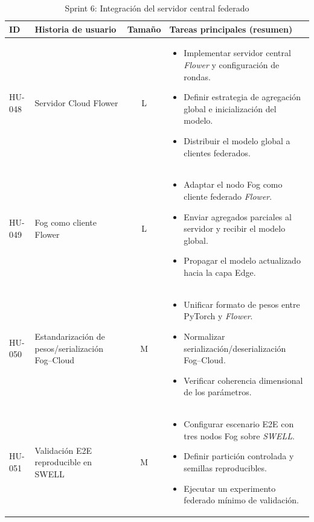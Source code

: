 \documentclass{report}
\begin{document}
\begin{table}[H]
\centering
\footnotesize
\caption{Sprint 6: Integración del servidor central federado}
\label{tab:sprint6}
\renewcommand{\arraystretch}{1.2}
\setlength{\tabcolsep}{4pt}
\begin{tabular}{|l|p{4.8cm}|c|p{5.6cm}|}
\hline
\textbf{ID} & \textbf{Historia de usuario} & \textbf{Tamaño} & \textbf{Tareas principales (resumen)} \\ \hline

HU-048 &
Servidor Cloud Flower &
L &
\begin{itemize}\setlength\itemsep{0.15em}
  \item Implementar servidor central \textit{Flower} y configuración de rondas.
  \item Definir estrategia de agregación global e inicialización del modelo.
  \item Distribuir el modelo global a clientes federados.
\end{itemize}
\\ \hline

HU-049 &
Fog como cliente Flower &
L &
\begin{itemize}\setlength\itemsep{0.15em}
  \item Adaptar el nodo Fog como cliente federado \textit{Flower}.
  \item Enviar agregados parciales al servidor y recibir el modelo global.
  \item Propagar el modelo actualizado hacia la capa Edge.
\end{itemize}
\\ \hline

HU-050 &
Estandarización de pesos/serialización Fog--Cloud &
M &
\begin{itemize}\setlength\itemsep{0.15em}
  \item Unificar formato de pesos entre PyTorch y \textit{Flower}.
  \item Normalizar serialización/deserialización Fog--Cloud.
  \item Verificar coherencia dimensional de los parámetros.
\end{itemize}
\\ \hline

HU-051 &
Validación E2E reproducible en SWELL &
M &
\begin{itemize}\setlength\itemsep{0.15em}
  \item Configurar escenario E2E con tres nodos Fog sobre \textit{SWELL}.
  \item Definir partición controlada y semillas reproducibles.
  \item Ejecutar un experimento federado mínimo de validación.
\end{itemize}
\\ \hline


\end{tabular}
\end{table}
\end{document}
